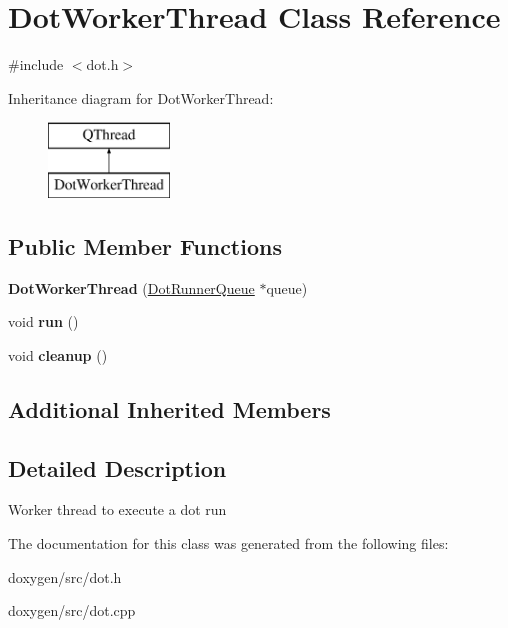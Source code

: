 \hypertarget{class_dot_worker_thread}{}\section{Dot\+Worker\+Thread Class Reference}
\label{class_dot_worker_thread}


{\ttfamily \#include $<$dot.\+h$>$}

Inheritance diagram for Dot\+Worker\+Thread\+:\begin{figure}[H]
\begin{center}
\leavevmode
\includegraphics[height=2.000000cm]{class_dot_worker_thread}
\end{center}
\end{figure}
\subsection*{Public Member Functions}
\begin{DoxyCompactItemize}
\item 
\mbox{\label{class_dot_worker_thread_ab60de9dd74465af1b2af295846db2db5}} 
{\bfseries Dot\+Worker\+Thread} (\mbox{\hyperlink{class_dot_runner_queue}{Dot\+Runner\+Queue}} $\ast$queue)
\item 
\mbox{\label{class_dot_worker_thread_a573402f10e5d1b1fba1954a105a1c227}} 
void {\bfseries run} ()
\item 
\mbox{\label{class_dot_worker_thread_abdef6c24880c1628f13a2a82e6374c0e}} 
void {\bfseries cleanup} ()
\end{DoxyCompactItemize}
\subsection*{Additional Inherited Members}


\subsection{Detailed Description}
Worker thread to execute a dot run 

The documentation for this class was generated from the following files\+:\begin{DoxyCompactItemize}
\item 
doxygen/src/dot.\+h\item 
doxygen/src/dot.\+cpp\end{DoxyCompactItemize}
